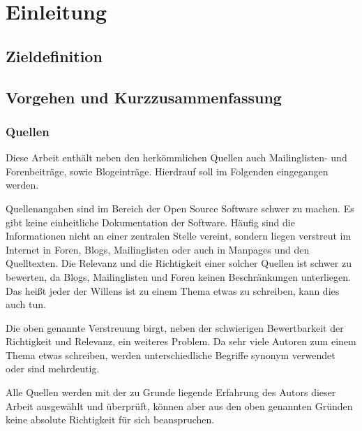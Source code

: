 \chapter{Einleitung}
\section{Zieldefinition}
\section{Vorgehen und Kurzzusammenfassung} 

\subsection{Quellen}
Diese Arbeit enthält neben den herkömmlichen Quellen auch Mailinglisten- und Forenbeiträge, sowie Blogeinträge. Hierdrauf soll im Folgenden eingegangen werden.

Quellenangaben sind im Bereich der Open Source Software schwer zu machen. Es gibt keine einheitliche Dokumentation der Software. Häufig sind die Informationen nicht an einer zentralen Stelle vereint, sondern liegen verstreut im Internet in Foren, Blogs, Mailinglisten oder auch in Manpages und den Quelltexten. Die Relevanz und die Richtigkeit einer solcher Quellen ist schwer zu bewerten, da Blogs, Mailinglisten und Foren keinen Beschränkungen unterliegen. Das heißt jeder der Willens ist zu einem Thema etwas zu schreiben, kann dies auch tun.

Die oben genannte Verstreuung birgt, neben der schwierigen Bewertbarkeit der Richtigkeit und Relevanz, ein weiteres Problem. Da sehr viele Autoren zum einem Thema etwas schreiben, werden unterschiedliche Begriffe synonym verwendet oder sind mehrdeutig.

Alle Quellen werden mit der zu Grunde liegende Erfahrung des Autors dieser Arbeit ausgewählt und überprüft, können aber aus den oben genannten Gründen keine absolute Richtigkeit für sich beanspruchen. 